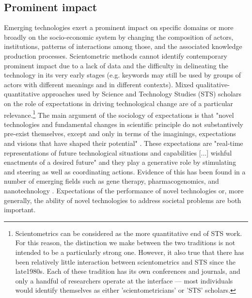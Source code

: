 \documentclass[11pt]{article}
\begin{document}
\subsection{Prominent impact}
Emerging technologies exert a prominent impact on specific domains or more broadly on the socio-economic system by changing the composition of actors, institutions, patterns of interactions among those, and the associated knowledge production processes. Scientometric methods cannot identify contemporary prominent impact due to a lack of data and the difficulty in delineating the technology in its very early stages (e.g. keywords may still be used by groups of actors with different meanings and in different contexts). Mixed qualitative-quantitative approaches used by Science and Technology Studies (STS) scholars on the role of expectations in driving technological change are of a particular relevance.\footnote{Scientometrics can be considered as the more quantitative end of STS work. For this reason, the distinction we make between the two traditions is not intended to be a particularly strong one. However, it also true that there has been relatively little interaction between scientometrics and STS since the late1980s. Each of these tradition has its own conferences and journals, and only a handful of researchers operate at the interface --- most individuals would identify themselves as either 'scientometricians' or 'STS' scholars.} The main argument of the sociology of expectations is that "novel technologies and fundamental changes in scientific principle do not substantively pre-exist themselves, except and only in terms of the imaginings, expectations and visions that have shaped their potential" \citep[p. 285]{Borup2006}. These expectations are "real-time representations of future technological situations and capabilities [...] wishful enactments of a desired future" \citep[p. 285]{Borup2006} and they play a generative role by stimulating and steering as well as coordinating actions. Evidence of this has been found in a number of emerging fields such as gene therapy, pharmacogenomics, and nanotechnology \citep[e.g.][]{Selin2007,Hedgecoe2003,Martin1999}.  Expectations of the performance of novel technologies or, more generally, the ability of novel technologies to address societal problems are both important. 
\end{document}
